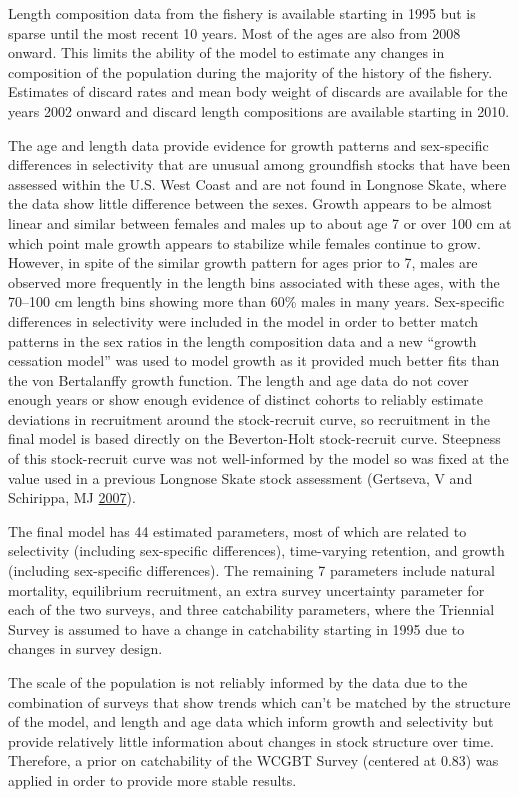 \documentclass[12pt,]{article}
\begin{document}
Length composition data from the fishery is available starting in 1995
but is sparse until the most recent 10 years. Most of the ages are also
from 2008 onward. This limits the ability of the model to estimate any
changes in composition of the population during the majority of the
history of the fishery. Estimates of discard rates and mean body weight
of discards are available for the years 2002 onward and discard length
compositions are available starting in 2010.

The age and length data provide evidence for growth patterns and
sex-specific differences in selectivity that are unusual among
groundfish stocks that have been assessed within the U.S. West Coast and
are not found in Longnose Skate, where the data show little difference
between the sexes. Growth appears to be almost linear and similar
between females and males up to about age 7 or over 100 cm at which
point male growth appears to stabilize while females continue to grow.
However, in spite of the similar growth pattern for ages prior to 7,
males are observed more frequently in the length bins associated with
these ages, with the 70--100 cm length bins showing more than 60\% males
in many years. Sex-specific differences in selectivity were included in
the model in order to better match patterns in the sex ratios in the
length composition data and a new ``growth cessation model'' was used to
model growth as it provided much better fits than the von Bertalanffy
growth function. The length and age data do not cover enough years or
show enough evidence of distinct cohorts to reliably estimate deviations
in recruitment around the stock-recruit curve, so recruitment in the
final model is based directly on the Beverton-Holt stock-recruit curve.
Steepness of this stock-recruit curve was not well-informed by the model
so was fixed at the value used in a previous Longnose Skate stock
assessment (Gertseva, V and Schirippa, MJ
\protect\hyperlink{ref-Gertseva2007}{2007}).

The final model has 44 estimated parameters, most of which are related
to selectivity (including sex-specific differences), time-varying
retention, and growth (including sex-specific differences). The
remaining 7 parameters include natural mortality, equilibrium
recruitment, an extra survey uncertainty parameter for each of the two
surveys, and three catchability parameters, where the Triennial Survey
is assumed to have a change in catchability starting in 1995 due to
changes in survey design.

The scale of the population is not reliably informed by the data due to
the combination of surveys that show trends which can't be matched by
the structure of the model, and length and age data which inform growth
and selectivity but provide relatively little information about changes
in stock structure over time. Therefore, a prior on catchability of the
WCGBT Survey (centered at 0.83) was applied in order to provide more
stable results.
\end{document}

